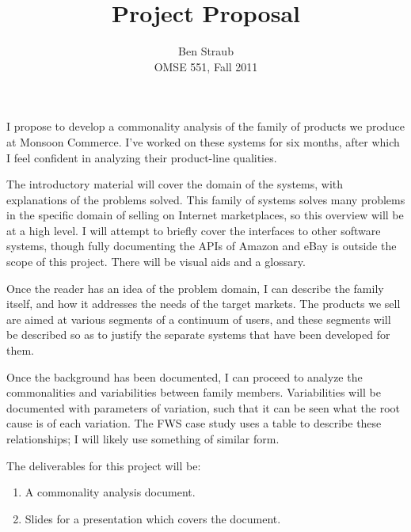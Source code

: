 \documentclass[letterpaper,11pt]{article}
\begin{document}
\author{Ben Straub\\OMSE 551, Fall 2011}
\title{Project Proposal}
\date{}
\maketitle

\pagestyle{empty}
\thispagestyle{empty}

\setlength{\parindent}{0pt}     %
\setlength{\parskip}{1em}       %

I propose to develop a commonality analysis of the family of products we produce at Monsoon Commerce.  I've worked on these systems for six months, after which I feel confident in analyzing their product-line qualities.

The introductory material will cover the domain of the systems, with explanations of the problems solved.  This family of systems solves many problems in the specific domain of selling on Internet marketplaces, so this overview will be at a high level.  I will attempt to briefly cover the interfaces to other software systems, though fully documenting the APIs of Amazon and eBay is outside the scope of this project.  There will be visual aids and a glossary.

Once the reader has an idea of the problem domain, I can describe the family itself, and how it addresses the needs of the target markets.  The products we sell are aimed at various segments of a continuum of users, and these segments will be described so as to justify the separate systems that have been developed for them.

Once the background has been documented, I can proceed to analyze the commonalities and variabilities between family members.  Variabilities will be documented with parameters of variation, such that it can be seen what the root cause is of each variation.  The FWS case study uses a table to describe these relationships; I will likely use something of similar form.

The deliverables for this project will be:

\begin{enumerate}
\item A commonality analysis document.
\item Slides for a presentation which covers the document.
\end{enumerate}
\end{document}
